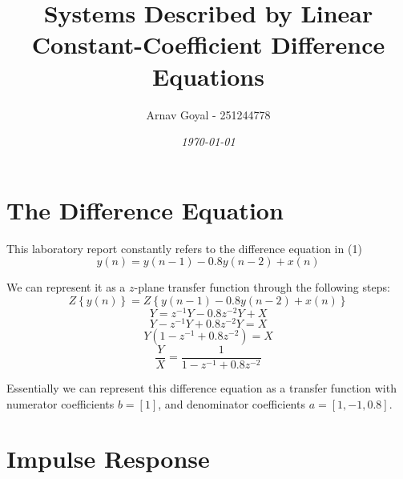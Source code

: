 \documentclass[]{report}
\title{\textbf{Systems Described by Linear Constant-Coefficient Difference Equations}}
\date{\textit{\today}}
\author{Arnav Goyal - 251244778}
\newcommand{\ztrans}[1]{Z\left\{ #1 \right\}}
\begin{document}
	\maketitle
	\section*{The Difference Equation}
	
	This laboratory report constantly refers to the difference equation in (1)
	\begin{equation}
		y(n) = y(n-1) - 0.8y(n-2) + x(n)
	\end{equation}
	
	We can represent it as a $z$-plane transfer function through the following steps:
		\[ \ztrans{y(n)} = \ztrans{ y(n-1) - 0.8y(n-2) + x(n) } \]
		\[ Y = z^{-1}Y -0.8z^{-2}Y + X	\]
		\[ Y - z^{-1}Y + 0.8z^{-2}Y = X	\]
		\[ Y\left( 1 - z^{-1} + 0.8z^{-2}\right) = X\]
		\[\frac{Y}{X} = \frac{1}{ 1 - z^{-1} + 0.8z^{-2}}\]
	
	Essentially we can represent this difference equation as a transfer function with numerator coefficients $b = \left[	1\right]$, and denominator coefficients $a = \left[1, -1, 0.8\right]$.
	
	\section*{Impulse Response}
		
	
\end{document}
